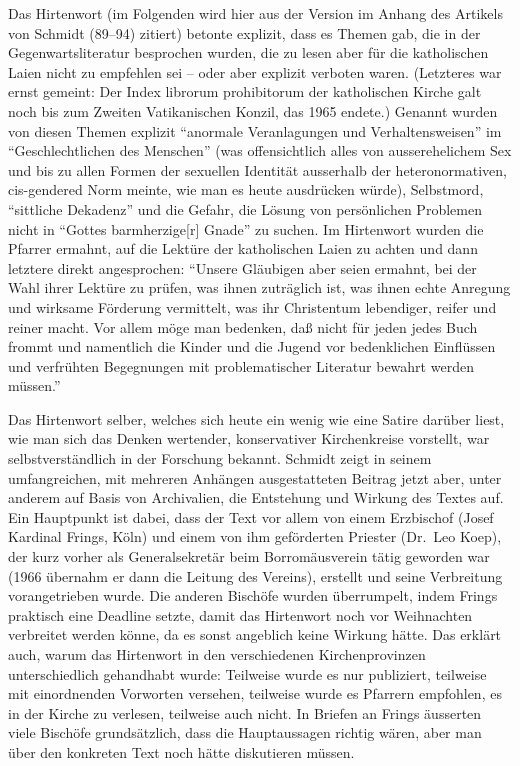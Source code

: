 \documentclass[a4paper,
fontsize=11pt,
oneside,
numbers=noperiodatend,
parskip=half-,
bibliography=totoc,
final
]{scrartcl}
\begin{document}
Das Hirtenwort (im Folgenden wird hier aus der Version im Anhang des
Artikels von Schmidt (89--94) zitiert) betonte explizit, dass es Themen
gab, die in der Gegenwartsliteratur besprochen wurden, die zu lesen aber
für die katholischen Laien nicht zu empfehlen sei -- oder aber explizit
verboten waren. (Letzteres war ernst gemeint: Der Index librorum
prohibitorum der katholischen Kirche galt noch bis zum Zweiten
Vatikanischen Konzil, das 1965 endete.) Genannt wurden von diesen Themen
explizit \enquote{anormale Veranlagungen und Verhaltensweisen} im
\enquote{Geschlechtlichen des Menschen} (was offensichtlich alles von
ausserehelichem Sex und bis zu allen Formen der sexuellen Identität
ausserhalb der heteronormativen, cis-gendered Norm meinte, wie man es
heute ausdrücken würde), Selbstmord, \enquote{sittliche Dekadenz} und
die Gefahr, die Lösung von persönlichen Problemen nicht in
\enquote{Gottes barmherzige{[}r{]} Gnade} zu suchen. Im Hirtenwort
wurden die Pfarrer ermahnt, auf die Lektüre der katholischen Laien zu
achten und dann letztere direkt angesprochen: \enquote{Unsere Gläubigen
aber seien ermahnt, bei der Wahl ihrer Lektüre zu prüfen, was ihnen
zuträglich ist, was ihnen echte Anregung und wirksame Förderung
vermittelt, was ihr Christentum lebendiger, reifer und reiner macht. Vor
allem möge man bedenken, daß nicht für jeden jedes Buch frommt und
namentlich die Kinder und die Jugend vor bedenklichen Einflüssen und
verfrühten Begegnungen mit problematischer Literatur bewahrt werden
müssen.}

Das Hirtenwort selber, welches sich heute ein wenig wie eine Satire
darüber liest, wie man sich das Denken wertender, konservativer
Kirchenkreise vorstellt, war selbstverständlich in der Forschung
bekannt. Schmidt zeigt in seinem umfangreichen, mit mehreren Anhängen
ausgestatteten Beitrag jetzt aber, unter anderem auf Basis von
Archivalien, die Entstehung und Wirkung des Textes auf. Ein Hauptpunkt
ist dabei, dass der Text vor allem von einem Erzbischof (Josef Kardinal
Frings, Köln) und einem von ihm geförderten Priester (Dr.~Leo Koep), der
kurz vorher als Generalsekretär beim Borromäusverein tätig geworden war
(1966 übernahm er dann die Leitung des Vereins), erstellt und seine
Verbreitung vorangetrieben wurde. Die anderen Bischöfe wurden
überrumpelt, indem Frings praktisch eine Deadline setzte, damit das
Hirtenwort noch vor Weihnachten verbreitet werden könne, da es sonst
angeblich keine Wirkung hätte. Das erklärt auch, warum das Hirtenwort in
den verschiedenen Kirchenprovinzen unterschiedlich gehandhabt wurde:
Teilweise wurde es nur publiziert, teilweise mit einordnenden Vorworten
versehen, teilweise wurde es Pfarrern empfohlen, es in der Kirche zu
verlesen, teilweise auch nicht. In Briefen an Frings äusserten viele
Bischöfe grundsätzlich, dass die Hauptaussagen richtig wären, aber man
über den konkreten Text noch hätte diskutieren müssen.
\end{document}
